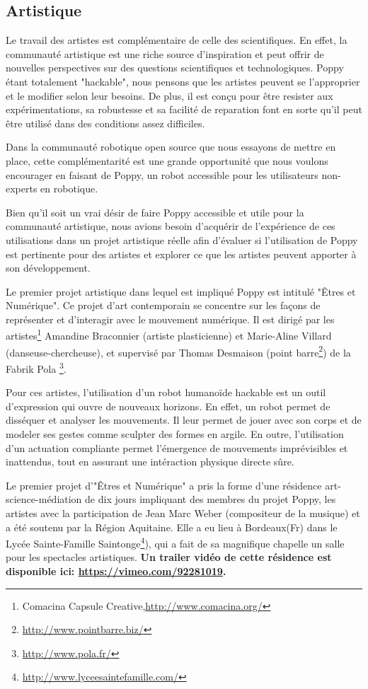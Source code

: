 \subsection*{Artistique} %

Le travail des artistes est complémentaire de celle des scientifiques. En effet, la communauté artistique est une riche source d'inspiration et peut offrir de nouvelles perspectives sur des questions scientifiques et technologiques. 
Poppy étant totalement "hackable", nous pensons que les artistes peuvent se l'approprier et le modifier selon leur besoins. De plus, il est conçu pour être resister aux expérimentations, sa robustesse et sa facilité de reparation font en sorte qu'il peut être utilisé dans des conditions assez difficiles.

Dans la communauté robotique open source que nous essayons de mettre en place, cette complémentarité est une grande opportunité que nous voulons encourager en faisant de Poppy, un robot accessible pour les utilisateurs non-experts en robotique.

Bien qu'il soit un vrai désir de faire Poppy accessible et utile pour la communauté artistique, nous avions besoin d'acquérir de l'expérience de ces utilisations dans un projet artistique réelle afin d'évaluer si l'utilisation de Poppy est pertinente pour des artistes et explorer ce que les artistes peuvent apporter à son développement.


Le premier projet artistique dans lequel est impliqué Poppy est intitulé "Êtres et Numérique". Ce projet d'art contemporain se concentre sur les façons de représenter et d'interagir avec le mouvement numérique. Il est dirigé par les artistes\footnote{Comacina Capsule Creative,\url{http://www.comacina.org/}} Amandine Braconnier (artiste plasticienne) et Marie-Aline Villard (danseuse-chercheuse), et supervisé par Thomas Desmaison (point barre\footnote{\url{http://www.pointbarre.biz/}}) de la Fabrik Pola \footnote{\url{http://www.pola.fr/}}.


Pour ces artistes, l'utilisation d'un robot humanoïde hackable est un outil d'expression qui ouvre de nouveaux horizons. En effet, un robot permet de disséquer et analyser les mouvements. Il leur permet de jouer avec son corps et de modeler ses gestes comme sculpter des formes en argile. En outre, l'utilisation d'un actuation compliante permet l'émergence de mouvements imprévisibles et inattendus, tout en assurant une intéraction physique directe sûre.

Le premier projet d'"Êtres et Numérique" a pris la forme d'une résidence art-science-médiation de dix jours impliquant des membres du projet Poppy, les artistes avec la participation de Jean Marc Weber (compositeur de la musique) et a été soutenu par la Région Aquitaine. Elle a eu lieu à Bordeaux(Fr) dans le Lycée Sainte-Famille Saintonge\footnote{\url{http://www.lyceesaintefamille.com/}}), qui a fait de sa magnifique chapelle un salle pour les spectacles artistiques. \textbf{Un trailer vidéo de cette résidence est disponible ici: \url{https://vimeo.com/92281019}.}


